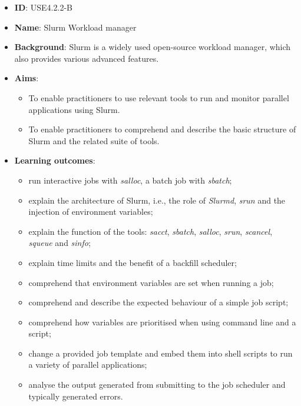 \documentclass[jocse]{jocseart}
\newcommand{\ag}[1]{\todo[inline]{Anja: #1}}
\newcommand{\kh}[1]{\todo[inline]{KH: #1}}
\begin{document}
\begin{itemize}
  \item \textbf{ID}: USE4.2.2-B
  \item \textbf{Name}: Slurm Workload manager
  \item \textbf{Background}: Slurm is a widely used open-source workload manager, which also provides various advanced features. %
  \item \textbf{Aims}:
  \begin{itemize}
    \item To enable practitioners to use relevant tools to run and monitor parallel applications using Slurm.
    \item To enable practitioners to comprehend and describe the basic structure of Slurm and the related suite of tools.
  \end{itemize}
  \item \textbf{Learning outcomes}:
  \begin{itemize}
  \item run interactive jobs with \textit{salloc}, a batch job with \textit{sbatch};
  \item explain the architecture of Slurm, i.e., the role of \textit{Slurmd}, \textit{srun} and the injection of environment variables;
  \item explain the function of the tools: \textit{sacct}, \textit{sbatch}, \textit{salloc}, \textit{srun}, \textit{scancel}, \textit{squeue} and \textit{sinfo};
  \item explain time limits and the benefit of a backfill scheduler;
  \item comprehend that environment variables are set when running a job;
  \item comprehend and describe the expected behaviour of a simple job script;
  \item comprehend how variables are prioritised when using command line and a script;
  \item change a provided job template and embed them into shell scripts to run a variety of parallel applications;
  \item analyse the output generated from submitting to the job scheduler and typically generated errors.
  \end{itemize}
\end{itemize}

\end{document}
